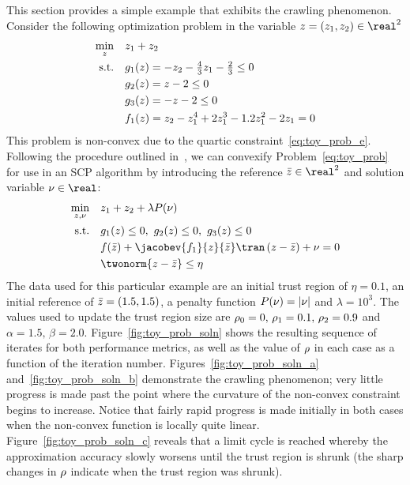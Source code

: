 \documentclass[letterpaper, 10 pt, conference]{ieeeconf}
\begin{document}
This section provides a simple example that exhibits the crawling phenomenon. Consider the following optimization problem in the variable $\z=(z_1,z_2)\in\real^2$
\begin{subequations}\label{eq:toy_prob}
\begin{align}
\min_{z} &\quad z_1+z_2 \label{eq:toy_prob_a}\\
\text{s.t.} &\quad g_1(z) = -z_2 - \tfrac{4}{3} z_1 - \tfrac{2}{3} \leq 0 \label{eq:toy_prob_b}\\
&\quad g_2(z) = z - 2 \leq 0 \label{eq:toy_prob_c}\\
&\quad g_3(z) = -z - 2 \leq 0 \label{eq:toy_prob_d}\\
&\quad f_1(z) = z_2 - z_1^4 + 2z_1^3 - 1.2z_1^2 - 2z_1 = 0 \label{eq:toy_prob_e}
\end{align}
\end{subequations}
This problem is non-convex due to the quartic constraint~\eqref{eq:toy_prob_e}. Following the procedure outlined in~, we can convexify Problem~\eqref{eq:toy_prob} for use in an SCP algorithm by introducing the reference $\zb\in\real^2$ and solution variable $\vc\in\real$:
\begin{subequations}\label{eq:toy_prob_cvx}
\begin{align}
\min_{\z,\vc} &\quad z_1+z_2 + \lambda P(\vc) \\
\text{s.t.} &\quad \fc_1(\z) \leq 0,~\fc_2(\z)\leq0,~\fc_3(\z)\leq0 \\
&\quad \fne(\zb) + \jacobev{\fne_1}{z}{\zb}\tran\left( \z - \zb \right) + \vc = 0 \\
&\quad \twonorm{\z - \zb} \leq \eta
\end{align}
\end{subequations}
The data used for this particular example are an initial trust region of $\eta=0.1$, an initial reference of $\bar{z}=(1.5,1.5)$, a penalty function $P(\nu) = | \nu |$ and $\lambda=10^3$. The values used to update the trust region size are $\rho_0=0,\,\rho_1=0.1,\,\rho_2=0.9$ and $\alpha=1.5,\,\beta=2.0$. Figure~\ref{fig:toy_prob_soln} shows the resulting sequence of iterates for both performance metrics, as well as the value of $\rho$ in each case as a function of the iteration number. Figures~\ref{fig:toy_prob_soln_a} and~\ref{fig:toy_prob_soln_b} demonstrate the crawling phenomenon; very little progress is made past the point where the curvature of the non-convex constraint begins to increase. Notice that fairly rapid progress is made initially in both cases when the non-convex function is locally quite linear. Figure~\ref{fig:toy_prob_soln_c} reveals that a limit cycle is reached whereby the approximation accuracy slowly worsens until the trust region is shrunk (the sharp changes in $\rho$ indicate when the trust region was shrunk). 
\end{document}
